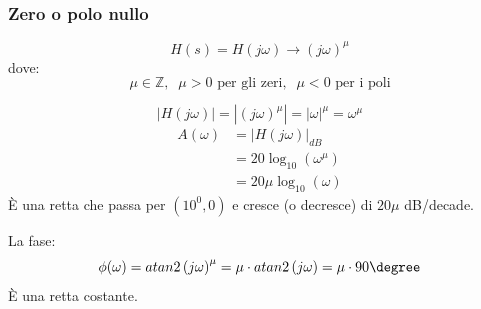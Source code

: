 \documentclass[a4paper]{article}
\begin{document}
\subsubsection{Zero o polo nullo}
\[
  H(s) = H(j \omega) \to  \left( j \omega \right)^{\mu}
\] 
dove:
\[
  \mu \in \mathbb{Z}, \;\; \mu > 0 \text{ per gli zeri},\;\; \mu < 0 \text{ per i poli} 
\] 
\begin{figure}[H]
  \centering
\end{figure}
\noindent
\begin{definition}
  \[
    \left| H(j \omega) \right| = \left| \left( j \omega \right)^{\mu} \right| = \left| \omega \right|^{\mu} = \omega^{\mu}
  \] 
  \[
    \begin{aligned}
      A(\omega) &= \left| H(j \omega) \right|_{dB}\\
                &= 20 \log_{10} \left( \omega^{\mu} \right)\\
                &= 20 \mu \log_{10} \left( \omega \right)
    \end{aligned}
  \] 
  È una retta che passa per \( \left( 10^0,0 \right) \) e cresce (o decresce) di
  \( 20 \mu \) dB/decade.

  \noindent
  La fase:
  \[
    \phi(\omega) = atan2\left( j \omega \right)^{\mu} = \mu \cdot atan2\left( j \omega \right) = \mu \cdot 90\degree
  \] 
  È una retta costante.
\end{definition}
\end{document}
